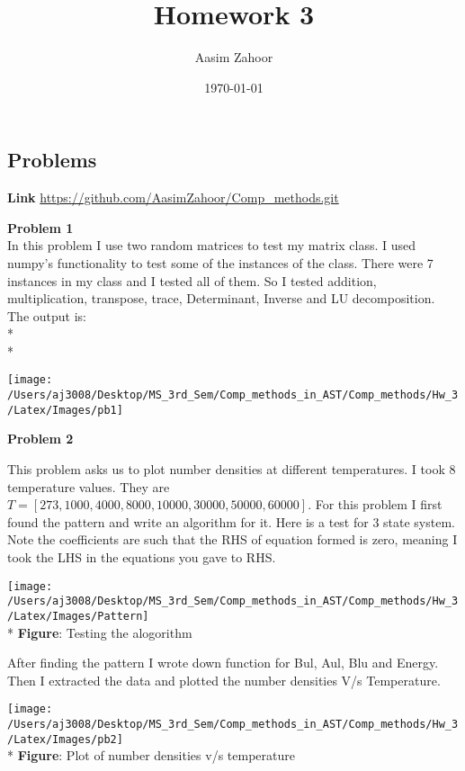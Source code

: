 \documentclass{article}
\title{Homework 3}
\author{Aasim Zahoor}
\date\today
\begin{document}
\maketitle 


\begin{center}
\section{Problems}
\end{center}
\textbf{Link}\vspace{1.5em}
\url{https://github.com/AasimZahoor/Comp_methods.git}
\vspace{1.5em}

\textbf{Problem 1}\vspace{1.5em}
\\
In this problem I use two random matrices to test my matrix class. I used numpy's functionality to test some of the instances of the class. There were 7 instances in my class and I tested all of them. So I tested addition, multiplication, transpose, trace, Determinant, Inverse and LU decomposition. The output is:
\\*
\\*
\begin{center}
\texttt{[image: /Users/aj3008/Desktop/MS\_3rd\_Sem/Comp\_methods\_in\_AST/Comp\_methods/Hw\_3/Latex/Images/pb1]}
\end{center}

\clearpage

\textbf{Problem 2}\vspace{1.5em}

This problem asks us to plot number densities at different temperatures. I took 8 temperature values. They are $T=[273,1000,4000,8000,10000,30000,50000,60000]$. For this problem I first found the pattern and write an algorithm for it. Here is a test for 3 state system. Note the coefficients are such that the RHS of equation formed is zero, meaning I took the LHS in the equations you gave to RHS.

\begin{center}
\texttt{[image: /Users/aj3008/Desktop/MS\_3rd\_Sem/Comp\_methods\_in\_AST/Comp\_methods/Hw\_3/Latex/Images/Pattern]}
\\*
\textbf{Figure}: Testing the alogorithm
\end{center}

After finding the pattern I wrote down function for Bul, Aul, Blu and Energy. Then I extracted the data and plotted the number densities V/s Temperature.
\begin{center}
\texttt{[image: /Users/aj3008/Desktop/MS\_3rd\_Sem/Comp\_methods\_in\_AST/Comp\_methods/Hw\_3/Latex/Images/pb2]}
\\*
\textbf{Figure}: Plot of number densities v/s temperature
\end{center} 
\end{document}
